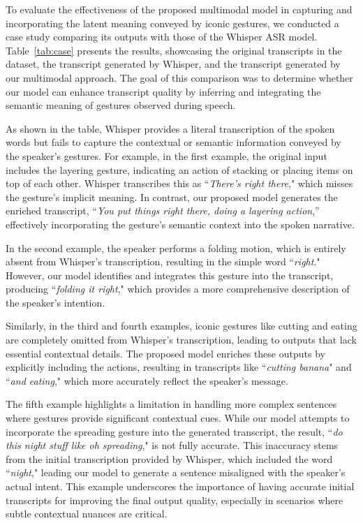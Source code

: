 \begin{table}[t]
{\begin{tabular}{@{}clll@{}}
\end{tabular}%
}
\end{table}

To evaluate the effectiveness of the proposed multimodal model in capturing and incorporating the latent meaning conveyed by iconic gestures, we conducted a case study comparing its outputs with those of the Whisper ASR model. Table~\ref{tab:case} presents the results, showcasing the original transcripts in the dataset, the transcript generated by Whisper, and the transcript generated by our multimodal approach. The goal of this comparison was to determine whether our model can enhance transcript quality by inferring and integrating the semantic meaning of gestures observed during speech.

As shown in the table, Whisper provides a literal transcription of the spoken words but fails to capture the contextual or semantic information conveyed by the speaker's gestures. For example, in the first example, the original input includes the layering gesture, indicating an action of stacking or placing items on top of each other. Whisper transcribes this as ``\textit{There's right there}," which misses the gesture's implicit meaning. In contrast, our proposed model generates the enriched transcript, ``\textit{You put things right there, doing a layering action},'' effectively incorporating the gesture's semantic context into the spoken narrative.

In the second example, the speaker performs a folding motion, which is entirely absent from Whisper's transcription, resulting in the simple word ``\textit{right}." However, our model identifies and integrates this gesture into the transcript, producing ``\textit{folding it right}," which provides a more comprehensive description of the speaker's intention.

Similarly, in the third and fourth examples, iconic gestures like cutting and eating are completely omitted from Whisper's transcription, leading to outputs that lack essential contextual details. The proposed model enriches these outputs by explicitly including the actions, resulting in transcripts like ``\textit{cutting banana}" and ``\textit{and eating}," which more accurately reflect the speaker's message.

The fifth example highlights a limitation in handling more complex sentences where gestures provide significant contextual cues. While our model attempts to incorporate the spreading gesture into the generated transcript, the result, ``\textit{do this night stuff like oh spreading}," is not fully accurate. This inaccuracy stems from the initial transcription provided by Whisper, which included the word ``\textit{night}," leading our model to generate a sentence misaligned with the speaker's actual intent. This example underscores the importance of having accurate initial transcripts for improving the final output quality, especially in scenarios where subtle contextual nuances are critical.

